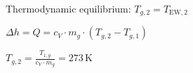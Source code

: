 Thermodynamic equilibrium: \( T_{g,2} = T_{\text{EW},2} \)  

\( \Delta h = Q = c_V \cdot m_g \cdot (T_{g,2} - T_{g,1}) \)  

\( T_{g,2} = \frac{T_{1,g}}{c_V \cdot m_g} = 273 \, \text{K} \)